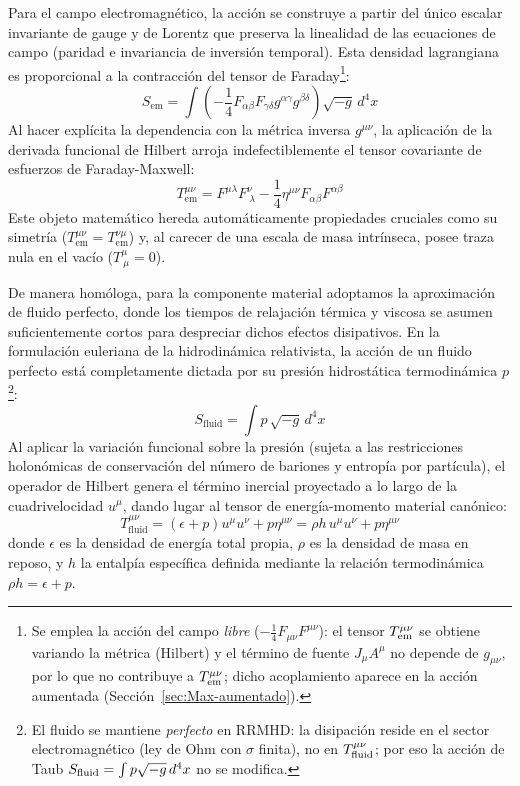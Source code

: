Para el campo electromagnético, la acción se construye a partir del único escalar invariante de gauge y de Lorentz que preserva la linealidad de las ecuaciones de campo (paridad e invariancia de inversión temporal). Esta densidad lagrangiana es proporcional a la contracción del tensor de Faraday\footnote{Se emplea la acción del campo \emph{libre} ($-\tfrac14 F_{\mu\nu}F^{\mu\nu}$): el tensor $T^{\mu\nu}_{\rm em}$ se obtiene variando la métrica (Hilbert) y el término de fuente $J_\mu A^\mu$ no depende de $g_{\mu\nu}$, por lo que no contribuye a $T^{\mu\nu}_{\rm em}$; dicho acoplamiento aparece en la acción aumentada (Sección~\ref{sec:Max-aumentado}).}:
\begin{equation}
    S_{\text{em}} = \int \left( -\frac{1}{4} F_{\alpha\beta} F_{\gamma\delta} g^{\alpha\gamma} g^{\beta\delta} \right) \sqrt{-g} \, d^4x
\end{equation}
Al hacer explícita la dependencia con la métrica inversa $g^{\mu\nu}$, la aplicación de la derivada funcional de Hilbert arroja indefectiblemente el tensor covariante de esfuerzos de Faraday-Maxwell:
\begin{equation}
    T^{\mu\nu}_{\text{em}} = F^{\mu\lambda} F^\nu_{\ \lambda} - \frac{1}{4} \eta^{\mu\nu} F_{\alpha\beta} F^{\alpha\beta}
\end{equation}
Este objeto matemático hereda automáticamente propiedades cruciales como su simetría ($T^{\mu\nu}_{\text{em}} = T^{\nu\mu}_{\text{em}}$) y, al carecer de una escala de masa intrínseca, posee traza nula en el vacío ($T^\mu_{\ \mu} = 0$).

De manera homóloga, para la componente material adoptamos la aproximación de fluido perfecto, donde los tiempos de relajación térmica y viscosa se asumen suficientemente cortos para despreciar dichos efectos disipativos. En la formulación euleriana de la hidrodinámica relativista, la acción de un fluido perfecto está completamente dictada por su presión hidrostática termodinámica $p$\footnote{El fluido se mantiene \emph{perfecto} en RRMHD: la disipación reside en el sector electromagnético (ley de Ohm con $\sigma$ finita), no en $T^{\mu\nu}_{\rm fluid}$; por eso la acción de Taub $S_{\rm fluid}=\int p\sqrt{-g}\,d^4x$ no se modifica.}:
\begin{equation}
    S_{\text{fluid}} = \int p \, \sqrt{-g} \, d^4x
\end{equation}
Al aplicar la variación funcional sobre la presión (sujeta a las restricciones holonómicas de conservación del número de bariones y entropía por partícula), el operador de Hilbert genera el término inercial proyectado a lo largo de la cuadrivelocidad $u^\mu$, dando lugar al tensor de energía-momento material canónico:
\begin{equation}
    T^{\mu\nu}_{\text{fluid}} = (\epsilon + p) u^\mu u^\nu + p \eta^{\mu\nu} = \rho h\, u^\mu u^\nu + p \eta^{\mu\nu}
    \label{eq:T_fluid}
\end{equation}
donde $\epsilon$ es la densidad de energía total propia, $\rho$ es la densidad de masa en reposo, y $h$ la entalpía específica definida mediante la relación termodinámica $\rho h = \epsilon + p$.

